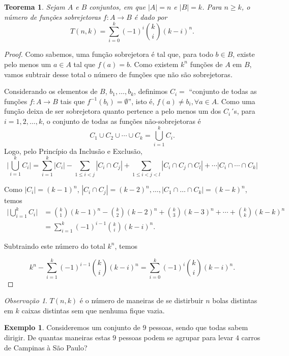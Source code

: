 \documentclass[]{book}
\newtheorem{theorem}{Teorema}[chapter]
\theoremstyle{definition}
\theoremstyle{definition}
\newtheorem{example}{Exemplo}[chapter]
\theoremstyle{definition}
\theoremstyle{remark}
\newtheorem*{remark}{Observação}
\begin{document}
\begin{theorem}
\protect\hypertarget{thm:teoFuncoesSobrejetoras}{}{\label{thm:teoFuncoesSobrejetoras} }Sejam \(A\) e \(B\) conjuntos, em que \(|A|=n\) e \(|B|=k\).
Para \(n\geq k\), o número de funções sobrejetoras \(f:A\rightarrow B\) é dado por
\[T(n,k) = \sum_{i=0}^{k}(-1)^i{k \choose i}(k-i)^n.\]
\end{theorem}

\begin{proof}
\iffalse{} {Prova. } \fi{}Como sabemos, uma função sobrejetora é tal que, para todo \(b \in B\), existe pelo menos um \(a \in A\) tal que \(f(a)=b\).
Como existem \(k^n\) funções de \(A\) em \(B\), vamos subtrair desse total o número de funções que não são sobrejetoras.

Considerando os elementos de \(B\), \(b_1, \ldots, b_k\), definimos \(C_i=\) ``conjunto de todas as funções \(f:A\rightarrow B\) tais que \(f^{-1}(b_i)=\emptyset\)'', isto é,
\(f(a)\neq b_i, \forall a \in A\).
Como uma função deixa de ser sobrejetora quanto pertence a pelo menos um dos \(C_i\)´s, para \(i=1,2,\ldots, k\), o conjunto de todas as funções não-sobrejetoras é
\[C_1 \cup C_2 \cup\cdots \cup C_k = \bigcup_{i=1}^{k}C_i.\]
Logo, pelo Princípio da Inclusão e Exclusão,
\[\Big|\bigcup_{i=1}^{k}C_i\Big| = \sum_{i=1}^{k}|C_i| - \sum_{1\leq i<j}^{}|C_i\cap C_j| + \sum_{1\leq i<j<l}^{}|C_i\cap C_j\cap C_l| + \cdots |C_i\cap\cdots\cap C_k|\]

Como \(|C_i|=(k-1)^n\), \(|C_i\cap C_j| = (k-2)^n, \ldots, |C_1\cap\ldots\cap C_k|=(k-k)^n\), temos
\begin{align}
  \Big|\bigcup_{i=1}^{k}C_i\Big| 
  &={k \choose 1}(k-1)^n - {k \choose 2}(k-2)^n + {k \choose 3}(k-3)^n + \cdots + {k \choose k}(k-k)^n \\
  &=\sum_{i=1}^{k}(-1)^{i-1}{k \choose i}(k-i)^n.
\end{align}

Subtraindo este número do total \(k^n\), temos

\[k^n-\sum_{i=1}^{k}(-1)^{i-1}{k \choose i}(k-i)^n = \sum_{i=0}^{k}(-1)^{i}{k \choose i}(k-i)^n.\]
\end{proof}

\begin{remark}
\iffalse{} {Observação. } \fi{}\(T(n,k)\) é o número de maneiras de se distirbuir \(n\) bolas distintas em \(k\) caixas distintas sem que nenhuma fique vazia.
\end{remark}

\begin{example}
\protect\hypertarget{exm:unnamed-chunk-89}{}{\label{exm:unnamed-chunk-89} }Consideremos um conjunto de \(9\) pessoas, sendo que todas sabem dirigir.
De quantas maneiras estas \(9\) pessoas podem se agrupar para levar \(4\) carros de Campinas à São Paulo?
\end{example}
\end{document}
